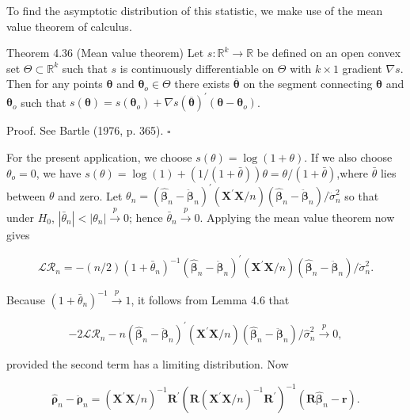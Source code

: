 \documentclass[10pt]{article}
\begin{document}
To find the asymptotic distribution of this statistic, we make use of the mean value theorem of calculus.

Theorem 4.36 (Mean value theorem) Let $s: \mathbb{R}^{k} \rightarrow \mathbb{R}$ be defined on an open convex set $\Theta \subset \mathbb{R}^{k}$ such that $s$ is continuously differentiable on $\Theta$ with $k \times 1$ gradient $\nabla s$. Then for any points $\boldsymbol{\theta}$ and $\boldsymbol{\theta}_{o} \in \Theta$ there exists $\overline{\boldsymbol{\theta}}$ on the segment connecting $\boldsymbol{\theta}$ and $\boldsymbol{\theta}_{o}$ such that $s(\boldsymbol{\theta})=s\left(\boldsymbol{\theta}_{o}\right)+\nabla s(\overline{\boldsymbol{\theta}})^{\prime}\left(\boldsymbol{\theta}-\boldsymbol{\theta}_{o}\right)$.

Proof. See Bartle (1976, p. 365). \(\square\)

For the present application, we choose $s(\theta)=\log (1+\theta)$. If we also choose $\theta_{o}=0$, we have $s(\theta)=\log (1)+(1 /(1+\bar{\theta})) \theta=\theta /(1+\bar{\theta})$,where $\bar{\theta}$ lies between $\theta$ and zero. Let $\theta_{n}=\left(\hat{\boldsymbol{\beta}}_{n}-\ddot{\boldsymbol{\beta}}_{n}\right)^{\prime}\left(\mathbf{X}^{\prime} \mathbf{X} / n\right)\left(\hat{\boldsymbol{\beta}}_{n}-\ddot{\boldsymbol{\beta}}_{n}\right) / \ddot{\sigma}_{n}^{2}$ so that under $H_{0}$, $\left|\bar{\theta}_{n}\right|<\left|\theta_{n}\right| \xrightarrow{p} 0$; hence $\bar{\theta}_{n} \xrightarrow{p} 0$. Applying the mean value theorem now gives

$$
\mathcal{L} \mathcal{R}_{n}=-(n / 2)\left(1+\bar{\theta}_{n}\right)^{-1}\left(\hat{\boldsymbol{\beta}}_{n}-\ddot{\boldsymbol{\beta}}_{n}\right)^{\prime}\left(\mathbf{X}^{\prime} \mathbf{X} / n\right)\left(\hat{\boldsymbol{\beta}}_{n}-\ddot{\boldsymbol{\beta}}_{n}\right) / \ddot{\sigma}_{n}^{2} .
$$

Because $\left(1+\bar{\theta}_{n}\right)^{-1} \xrightarrow{p} 1$, it follows from Lemma 4.6 that

$$
-2 \mathcal{L} \mathcal{R}_{n}-n\left(\hat{\boldsymbol{\beta}}_{n}-\ddot{\boldsymbol{\beta}}_{n}\right)^{\prime}\left(\mathbf{X}^{\prime} \mathbf{X} / n\right)\left(\hat{\boldsymbol{\beta}}_{n}-\ddot{\boldsymbol{\beta}}_{n}\right) / \hat{\sigma}_{n}^{2} \xrightarrow{p} 0,
$$

provided the second term has a limiting distribution. Now

$$
\hat{\boldsymbol{\rho}}_{n}-\ddot{\boldsymbol{\rho}}_{n}=\left(\mathbf{X}^{\prime} \mathbf{X} / n\right)^{-1} \mathbf{R}^{\prime}\left(\mathbf{R}\left(\mathbf{X}^{\prime} \mathbf{X} / n\right)^{-1} \mathbf{R}^{\prime}\right)^{-1}\left(\mathbf{R} \hat{\boldsymbol{\beta}}_{n}-\mathbf{r}\right) .
$$
\end{document}
